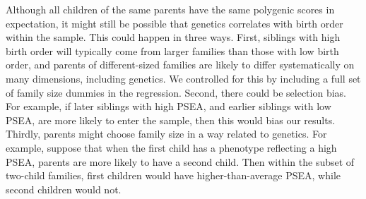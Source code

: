 \documentclass[
  12pt,
]{article}
\theoremstyle{definition}
\theoremstyle{definition}
\theoremstyle{definition}
\theoremstyle{definition}
\theoremstyle{remark}
\begin{document}
Although all children of the same parents have the same polygenic scores
in expectation, it might still be possible that genetics correlates with
birth order within the sample. This could happen in three ways. First,
siblings with high birth order will typically come from larger families
than those with low birth order, and parents of different-sized families
are likely to differ systematically on many dimensions, including
genetics. We controlled for this by including a full set of family size
dummies in the regression. Second, there could be selection bias. For
example, if later siblings with high PSEA, and earlier siblings with low
PSEA, are more likely to enter the sample, then this would bias our
results. Thirdly, parents might choose family size in a way related to
genetics. For example, suppose that when the first child has a phenotype
reflecting a high PSEA, parents are more likely to have a second child.
Then within the subset of two-child families, first children would have
higher-than-average PSEA, while second children would not.
\end{document}

